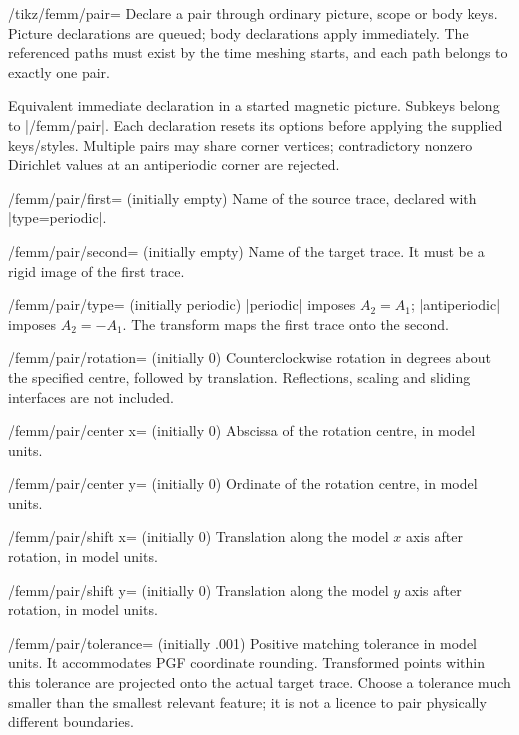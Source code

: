 \begin{key}{/tikz/femm/pair=}
Declare a pair through ordinary picture, scope or body keys. Picture declarations
are queued; body declarations apply immediately. The referenced paths must exist
by the time meshing starts, and each path belongs to exactly one pair.
\end{key}
\begin{command}{\femmpair{}}
Equivalent immediate declaration in a started magnetic picture. Subkeys belong
to |/femm/pair|. Each declaration resets its options before applying the supplied
keys/styles. Multiple pairs may share corner vertices; contradictory nonzero
Dirichlet values at an antiperiodic corner are rejected.
\end{command}
\begin{key}{/femm/pair/first= (initially empty)}
Name of the source trace, declared with |type=periodic|.
\end{key}
\begin{key}{/femm/pair/second= (initially empty)}
Name of the target trace. It must be a rigid image of the first trace.
\end{key}
\begin{key}{/femm/pair/type= (initially periodic)}
|periodic| imposes $A_2=A_1$; |antiperiodic| imposes $A_2=-A_1$.
The transform maps the first trace onto the second.
\end{key}
\begin{key}{/femm/pair/rotation= (initially 0)}
Counterclockwise rotation in degrees about the specified centre, followed by
translation. Reflections, scaling and sliding interfaces are not included.
\end{key}
\begin{key}{/femm/pair/center x= (initially 0)}
Abscissa of the rotation centre, in model units.
\end{key}
\begin{key}{/femm/pair/center y= (initially 0)}
Ordinate of the rotation centre, in model units.
\end{key}
\begin{key}{/femm/pair/shift x= (initially 0)}
Translation along the model $x$ axis after rotation, in model units.
\end{key}
\begin{key}{/femm/pair/shift y= (initially 0)}
Translation along the model $y$ axis after rotation, in model units.
\end{key}
\begin{key}{/femm/pair/tolerance= (initially .001)}
Positive matching tolerance in model units. It accommodates PGF coordinate
rounding. Transformed points within this tolerance are projected onto the actual
target trace. Choose a tolerance much smaller than the smallest relevant feature;
it is not a licence to pair physically different boundaries.
\end{key}

